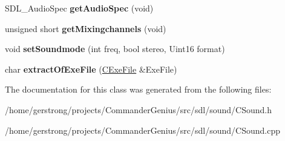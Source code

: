 \begin{DoxyCompactItemize}
\item 
\hypertarget{class_c_sound_a991ce315830cf8dc516c4d5975536d6e}{
SDL\_\-AudioSpec {\bfseries getAudioSpec} (void)}
\label{class_c_sound_a991ce315830cf8dc516c4d5975536d6e}

\item 
\hypertarget{class_c_sound_a1478366294f6e4e4b12df06030b8087d}{
unsigned short {\bfseries getMixingchannels} (void)}
\label{class_c_sound_a1478366294f6e4e4b12df06030b8087d}

\item 
\hypertarget{class_c_sound_a912611fbdb6d714d0953d56528c9b5af}{
void {\bfseries setSoundmode} (int freq, bool stereo, Uint16 format)}
\label{class_c_sound_a912611fbdb6d714d0953d56528c9b5af}

\item 
\hypertarget{class_c_sound_a31f0aad9d9defae5e324a7855d29defc}{
char {\bfseries extractOfExeFile} (\hyperlink{class_c_exe_file}{CExeFile} \&ExeFile)}
\label{class_c_sound_a31f0aad9d9defae5e324a7855d29defc}

\end{DoxyCompactItemize}


The documentation for this class was generated from the following files:\begin{DoxyCompactItemize}
\item 
/home/gerstrong/projects/CommanderGenius/src/sdl/sound/CSound.h\item 
/home/gerstrong/projects/CommanderGenius/src/sdl/sound/CSound.cpp\end{DoxyCompactItemize}

